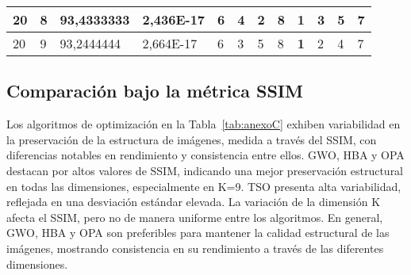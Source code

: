 \documentclass[conference]{IEEEtran}
\begin{document}
\begin{table*}[]
\begin{tabular}{|llll|llllllll|}
\multicolumn{1}{|l|}{20}                                                    & \multicolumn{1}{l|}{8}                                                        & \multicolumn{1}{l|}{93,4333333}                                                   & 2,436E-17                      & \multicolumn{1}{l|}{6}                                                  & \multicolumn{1}{l|}{4}                                                  & \multicolumn{1}{l|}{2}                                                  & \multicolumn{1}{l|}{8}                                                  & \multicolumn{1}{l|}{\textbf{1}}                                         & \multicolumn{1}{l|}{3}                                                  & \multicolumn{1}{l|}{5}                                                  & 7                          \\ \hline
\multicolumn{1}{|l|}{20}                                                    & \multicolumn{1}{l|}{9}                                                        & \multicolumn{1}{l|}{93,2444444}                                                   & 2,664E-17                      & \multicolumn{1}{l|}{6}                                                  & \multicolumn{1}{l|}{3}                                                  & \multicolumn{1}{l|}{5}                                                  & \multicolumn{1}{l|}{8}                                                  & \multicolumn{1}{l|}{\textbf{1}}                                         & \multicolumn{1}{l|}{2}                                                  & \multicolumn{1}{l|}{4}                                                  & 7                          \\ \hline
\end{tabular}
\end{table*}


\subsection{Comparación bajo la métrica SSIM}

\noindent Los algoritmos de optimización en la Tabla~\ref{tab:anexoC} exhiben variabilidad en la preservación de la estructura de imágenes, medida a través del SSIM, con diferencias notables en rendimiento y consistencia entre ellos. GWO, HBA y OPA destacan por altos valores de SSIM, indicando una mejor preservación estructural en todas las dimensiones, especialmente en K=9. TSO presenta alta variabilidad, reflejada en una desviación estándar elevada. La variación de la dimensión K afecta el SSIM, pero no de manera uniforme entre los algoritmos. En general, GWO, HBA y OPA son preferibles para mantener la calidad estructural de las imágenes, mostrando consistencia en su rendimiento a través de las diferentes dimensiones.
\end{document}
